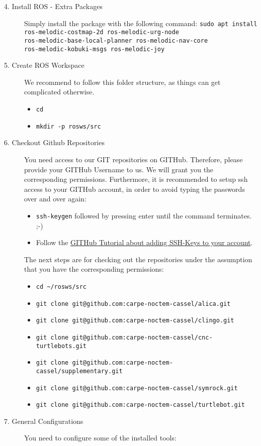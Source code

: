 \begin{description}
	\item[4. Install ROS - Extra Packages] Simply install the package with the following command: \verb#sudo apt install ros-melodic-costmap-2d ros-melodic-urg-node #\\\verb#ros-melodic-base-local-planner ros-melodic-nav-core#\\\verb#ros-melodic-kobuki-msgs ros-melodic-joy#
	\item[5. Create ROS Workspace] We recommend to follow this folder structure, as things can get complicated otherwise. 
	\begin{itemize}
		\item \verb#cd#
		\item \verb#mkdir -p rosws/src#
	\end{itemize}
	\item[6. Checkout Github Repositories] You need access to our GIT repositories on GITHub. Therefore, please provide your GITHub Username to us. We will grant you the corresponding permissions. Furthermore, it is recommended to setup ssh access to your GITHub account, in order to avoid typing the passwords over and over again:
	\begin{itemize}
		\item \verb#ssh-keygen# followed by pressing enter until the command terminates. ;-)
		\item Follow the \href{https://help.github.com/articles/adding-a-new-ssh-key-to-your-github-account/}{GITHub Tutorial about adding SSH-Keys to your account}.
	\end{itemize}
	The next steps are for checking out the repositories under the assumption that you have the corresponding permissions:
	\begin{itemize}
		\item \verb#cd ~/rosws/src#
		\item \verb#git clone git@github.com:carpe-noctem-cassel/alica.git#
		\item \verb#git clone git@github.com:carpe-noctem-cassel/clingo.git#
		\item \verb#git clone git@github.com:carpe-noctem-cassel/cnc-turtlebots.git#
		\item \verb#git clone git@github.com:carpe-noctem-cassel/supplementary.git#
		\item \verb#git clone git@github.com:carpe-noctem-cassel/symrock.git#
		\item \verb#git clone git@github.com:carpe-noctem-cassel/turtlebot.git#
	\end{itemize}
	\item[7. General Configurations] You need to configure some of the installed tools:

\end{description}
